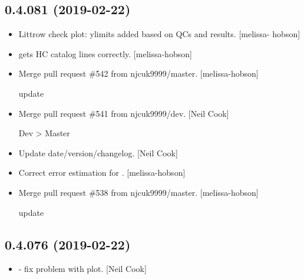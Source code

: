 \documentclass[a4paper,10pt,english]{report}
\begin{document}
\subsection{0.4.081 (2019-02-22)}
\label{\detokenize{misc/changelog:id178}}\begin{itemize}
\item {} 
Littrow check plot: ylimits added based on QCs and results. {[}melissa-
hobson{]}

\item {} 
 gets HC catalog lines correctly. {[}melissa-hobson{]}

\item {} 
Merge pull request \#542 from njcuk9999/master. {[}melissa-hobson{]}

update

\item {} 
Merge pull request \#541 from njcuk9999/dev. {[}Neil Cook{]}

Dev \textendash{}\textgreater{} Master

\item {} 
Update date/version/changelog. {[}Neil Cook{]}

\item {} 
Correct error estimation for . {[}melissa-hobson{]}

\item {} 
Merge pull request \#538 from njcuk9999/master. {[}melissa-hobson{]}

update

\end{itemize}


\subsection{0.4.076 (2019-02-22)}
\label{\detokenize{misc/changelog:id179}}\begin{itemize}
\item {} 
 - fix problem with  plot. {[}Neil
Cook{]}

\end{itemize}
\end{document}
